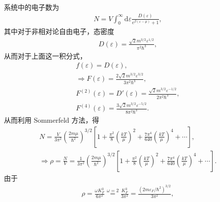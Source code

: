 \documentclass{assignment}
\begin{document}
\begin{pf}
    ~\\
    系统中的电子数为
    \begin{align}
        N=V\int_0^{\infty}\mathrm{d}\varepsilon\frac{D(\varepsilon)}{e^{\beta(\varepsilon-\mu)}+1},
    \end{align}
    其中对于非相对论自由电子，态密度
    \begin{align}
        D(\varepsilon)=\frac{\sqrt{2}m^{3/2}\varepsilon^{1/2}}{\pi^2\hbar^3},
    \end{align}
    从而对于上面这一积分式，
    \begin{gather}
        f(\varepsilon)=D(\varepsilon),\\
        \Longrightarrow F(\varepsilon)=\frac{2\sqrt{2}m^{3/2}\varepsilon^{3/2}}{3\pi^2\hbar^3},\\
        F^{(2)}(\varepsilon)=D'(\varepsilon)=\frac{\sqrt{2}m^{3/2}\varepsilon^{-1/2}}{2\pi^2\hbar^3},\\
        F^{(4)}(\varepsilon)=\frac{3\sqrt{2}m^{3/2}\varepsilon^{-5/2}}{8\pi^2\hbar^3}.
    \end{gather}
    从而利用 Sommerfeld 方法，得
    \begin{align}
        \label{2-N}
        N=\frac{V}{3\pi^2}\left(\frac{2m\mu}{\hbar^2}\right)^{3/2}\left[1+\frac{\pi^2}{8}\left(\frac{kT}{\mu}\right)^2+\frac{7\pi^4}{640}\left(\frac{kT}{\mu}\right)^4+\cdots\right],\\
        \Longrightarrow\rho=\frac{N}{V}=\frac{1}{3\pi^2}\left(\frac{2m\mu}{\hbar^2}\right)^{3/2}\left[1+\frac{\pi^2}{8}\left(\frac{kT}{\mu}\right)^2+\frac{7\pi^4}{640}\left(\frac{kT}{\mu}\right)^4+\cdots\right].
    \end{align}
    由于
    \begin{align}
        \rho=\frac{\omega K_F^3}{6\pi^2}\overset{\omega=2}{=}\frac{K_F^3}{3\pi^2}=\frac{(2m\varepsilon_F/\hbar^2)^{3/2}}{3\pi^2},
    \end{align}

\end{pf}
\end{document}
